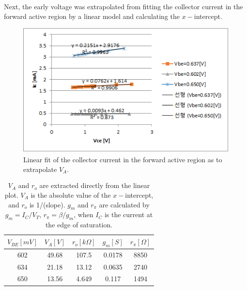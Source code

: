 \documentclass[a4paper, itemph]{oblivoir}
\theoremstyle{definition}
\begin{document}
Next, the early voltage was extrapolated from fitting the collector current in the forward active region by a linear model and calculating the $x-$intercept.

\begin{figure}[htb]
    \centering
    \includegraphics[width=0.5\linewidth]{early.png}
    \caption{Linear fit of the collector current in the forward active region as to extrapolate $V_A$.}
\end{figure}
\begin{table}[htb]
    \centering
    \begin{tabular}{c|c|c|c|c}
        $V_{BE}[mV]$ & $V_A[V]$ & $r_o[k\Omega]$ & $g_m[S]$ & $r_\pi[\Omega]$\\
        \hline
        602 & 49.68 & 107.5 & 0.0178 & 8850\\
        \hline
        634 & 21.18 & 13.12 & 0.0635 & 2740\\
        \hline
        650 & 13.56 & 4.649 & 0.117 & 1494
    \end{tabular}
    \caption{$V_A$ and $r_o$ are extracted directly from the linear plot. $V_A$ is the absolute value of the $x-$intercept, and $r_o$ is 1/(slope). $g_m$ and $r_\pi$ are calculated by $g_m=I_C/V_T$, $r_\pi=\beta/g_m$, when $I_C$ is the current at the edge of saturation.}
\end{table}
\end{document}
